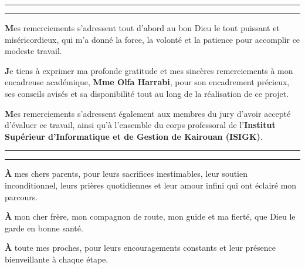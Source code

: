 \documentclass[12pt,fleqn,a4paper]{report}
\begin{document}
\begin{justify}
\begin{center}
  \rule[0.5ex]{3.2cm}{0.5pt}  \quad \rule[0.5ex]{3.2cm}{0.5pt}
\end{center}

\vspace{1.5cm}

\noindent \textbf{M}es remerciements s'adressent tout d'abord au bon Dieu le tout puissant et miséricordieux, qui m'a donné la force, la volonté et la patience pour accomplir ce modeste travail.

\vspace{0.8cm}

\noindent \textbf{J}e tiens à exprimer ma profonde gratitude et mes sincères remerciements à mon encadreuse académique, \textbf{Mme Olfa Harrabi}, pour son encadrement précieux, ses conseils avisés et sa disponibilité tout au long de la réalisation de ce projet.

\vspace{0.8cm}

\noindent \textbf{M}es remerciements s'adressent également aux membres du jury d'avoir accepté d'évaluer ce travail, ainsi qu'à l'ensemble du corps professoral de l'\textbf{Institut Supérieur d'Informatique et de Gestion de Kairouan (ISIGK)}.
\newpage
\thispagestyle{empty}

\vspace*{1.5cm}

\begin{center}
  \rule[0.5ex]{3.2cm}{0.5pt}  \quad \rule[0.5ex]{3.2cm}{0.5pt}
\end{center}

\vspace{1.2cm}

\begin{center}
  \noindent \textbf{À} mes chers parents, pour leurs sacrifices inestimables, leur soutien inconditionnel, leurs prières quotidiennes et leur amour infini qui ont éclairé mon parcours.

  \vspace{0.7cm}

  \noindent \textbf{À} mon cher frère, mon compagnon de route, mon guide et ma fierté, que Dieu le garde en bonne santé.

  \vspace{0.7cm}

  \noindent \textbf{À} toute mes proches, pour leurs encouragements constants et leur présence bienveillante à chaque étape.




\end{center}
\end{justify}
\end{document}
